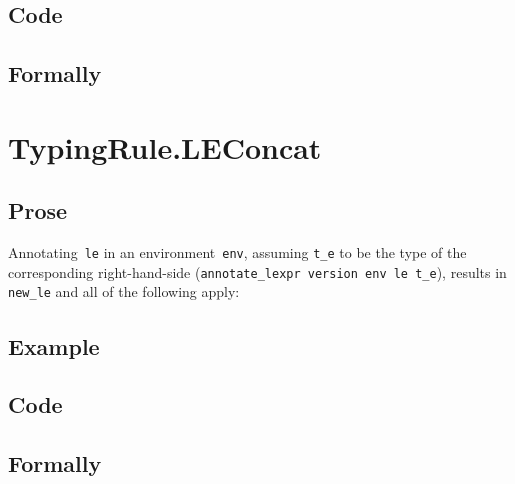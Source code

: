 \documentclass{book}
\begin{document}
  \subsection{Code}

\begin{emptyformal}
    \subsection{Formally}
\end{emptyformal}


\section{TypingRule.LEConcat \label{sec:TypingRule.LEConcat}}

    \subsection{Prose}
   Annotating~\texttt{le} in an environment~\texttt{env}, assuming
\texttt{t\_e} to be the type of the corresponding right-hand-side
(\texttt{annotate\_lexpr version env le t\_e}), results in \texttt{new\_le} and
all of the following apply:

  \subsection{Example}

  \subsection{Code}

\begin{emptyformal}
    \subsection{Formally}
\end{emptyformal}

\end{document}
